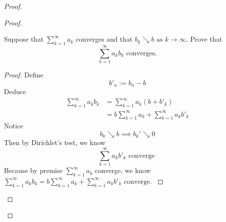 \documentclass{report}
\begin{document}
\begin{proof}
\begin{proof}
\begin{question}{}{}
Suppose that $\sum_{k=1}^{\infty} a_k$ 
converges and that 
$b_k \searrow b \text{ as } k \to \infty$. Prove that 
\begin{equation}
  \sum_{k=1}^{\infty} a_k b_k \text{ converges.}
\end{equation}
\end{question}
\begin{proof}
Define
\begin{equation}
b'_n:=b_n-b
\end{equation}
Deduce
\begin{align}
  \sum_{k=1}^\infty a_kb_k&=\sum_{k=1}^\infty a_k(b+b'_k)\\
  &=b\sum_{k=1}^\infty a_k+\sum_{k=1}^\infty a_kb'_k
\end{align}
Notice
\begin{equation}
b_k\searrow b\implies b_k'\searrow 0
\end{equation}
Then by Dirichlet's test, we know
\begin{equation}
\sum_{k=1}^\infty a_kb'_k\text{ converge }
\end{equation}
Because by premise $\sum_{k=1}^\infty a_k$ converge, we know $\sum_{k=1}^\infty a_kb_k=b\sum_{k=1}^\infty a_k+\sum_{k=1}^\infty a_kb'_k\text{ converge. }$


\end{proof}


\end{proof}
\end{proof}
\end{document}
